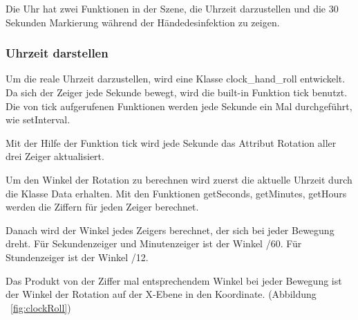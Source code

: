 Die Uhr hat zwei Funktionen in der Szene, die Uhrzeit darzustellen und die 30 Sekunden Markierung während der Händedesinfektion zu zeigen.
 
 \subsubsection{Uhrzeit darstellen}
 
 Um die reale Uhrzeit darzustellen, wird eine Klasse {\selectfont clock\_hand\_roll} entwickelt. Da sich der Zeiger jede Sekunde bewegt, wird die built-in Funktion {\selectfont tick} benutzt. Die von {\selectfont tick} aufgerufenen Funktionen werden jede Sekunde ein Mal durchgeführt, wie {\selectfont setInterval}.
 
 Mit der Hilfe der Funktion {\selectfont tick} wird jede Sekunde das Attribut {\selectfont Rotation} aller drei Zeiger aktualisiert. 
 
 Um den Winkel der Rotation zu berechnen wird zuerst die aktuelle Uhrzeit durch die Klasse {\selectfont Data} erhalten. Mit den Funktionen {\selectfont getSeconds}, {\selectfont getMinutes}, {\selectfont getHours} werden die Ziffern für jeden Zeiger berechnet.
 
 Danach wird der Winkel jedes Zeigers berechnet, der sich bei jeder Bewegung dreht. Für Sekundenzeiger und Minutenzeiger ist der Winkel {/60}. Für Stundenzeiger ist der Winkel {/12}.
 
 Das Produkt von der Ziffer mal entsprechendem Winkel bei jeder Bewegung ist der Winkel der Rotation auf der X-Ebene in den Koordinate. (Abbildung ~\ref{fig:clockRoll})
 
